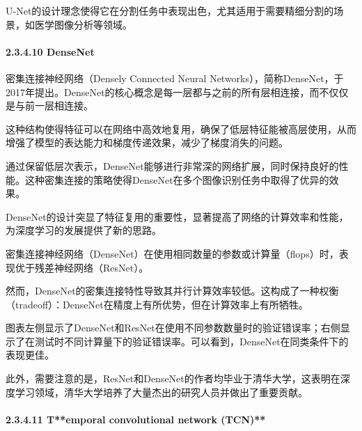 U-Net的设计理念使得它在分割任务中表现出色，尤其适用于需要精细分割的场景，如医学图像分析等领域。

\paragraph{\texorpdfstring{\textbf{2.3.4.10}
\textbf{DenseNet}}{2.3.4.10 DenseNet}}\label{23410-densenet}

密集连接神经网络（Densely Connected Neural
Networks），简称DenseNet，于2017年提出。DenseNet的核心概念是每一层都与之前的所有层相连接，而不仅仅是与前一层相连接。


这种结构使得特征可以在网络中高效地复用，确保了低层特征能被高层使用，从而增强了模型的表达能力和梯度传递效果，减少了梯度消失的问题。

通过保留低层次表示，DenseNet能够进行非常深的网络扩展，同时保持良好的性能。这种密集连接的策略使得DenseNet在多个图像识别任务中取得了优异的效果。

DenseNet的设计突显了特征复用的重要性，显著提高了网络的计算效率和性能，为深度学习的发展提供了新的思路。

密集连接神经网络（DenseNet）在使用相同数量的参数或计算量（flops）时，表现优于残差神经网络（ResNet）。

然而，DenseNet的密集连接特性导致其并行计算效率较低。这构成了一种权衡（tradeoff）：DenseNet在精度上有所优势，但在计算效率上有所牺牲。

图表左侧显示了DenseNet和ResNet在使用不同参数数量时的验证错误率；右侧显示了在测试时不同计算量下的验证错误率。可以看到，DenseNet在同类条件下的表现更佳。


此外，需要注意的是，ResNet和DenseNet的作者均毕业于清华大学，这表明在深度学习领域，清华大学培养了大量杰出的研究人员并做出了重要贡献。

\paragraph{\texorpdfstring{\textbf{2.3.4.11 T*}*emporal convolutional
network
(TCN)**}{2.3.4.11 T**emporal convolutional network (TCN)**}}\label{23411-temporal-convolutional-network-tcn}

